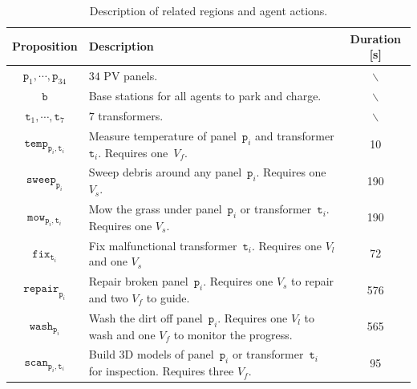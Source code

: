 \begin{table}[t]
	\centering
	\caption{Description of related regions and agent actions.}
	\label{fig:symbols}
	\begin{tabular}{|c|m{}|c|}\hline
		\textbf{Proposition} & \textbf{Description}\centering & \textbf{Duration} [s]\\ \hline
		$\texttt{p}_1,\cdots,\texttt{p}_{34}$ & $34$ PV panels. & $\backslash$ \\ \hline
		$\texttt{b}$ & Base stations for all agents to park and charge. & $\backslash$ \\ \hline
		$\texttt{t}_1,\cdots,\texttt{t}_7$ & $7$ transformers. & $\backslash$ \\ \hline
		$\texttt{temp}_{\texttt{p}_i,\texttt{t}_i}$ &
		Measure temperature of panel~$\texttt{p}_i$ and transformer $\texttt{t}_i$.
		Requires one~$V_f$. & 10 \\ \hline
		$\texttt{sweep}_{\texttt{p}_i}$& Sweep debris around any panel~$\texttt{p}_i$.
		Requires one $V_s$. & 190\\ \hline
		$\texttt{mow}_{\texttt{p}_i,\texttt{t}_i}$ &
		Mow the grass under panel~$\texttt{p}_i$ or transformer~$\texttt{t}_i$.
		Requires one $V_s$. & 190\\ \hline
		$\texttt{fix}_{\texttt{t}_i}$ &
		Fix malfunctional transformer~$\texttt{t}_i$.
		Requires one $V_l$ and one $V_s$ & 72\\ \hline
		$\texttt{repair}_{\texttt{p}_i}$ &
		Repair broken panel~$\texttt{p}_i$.
		Requires one $V_s$ to repair and two $V_f$ to guide. & 576\\ \hline
		$\texttt{wash}_{\texttt{p}_i}$ &
		Wash the dirt off panel~$\texttt{p}_i$.
		Requires one $V_l$ to wash and one $V_f$ to monitor the progress. & 565\\ \hline
		$\texttt{scan}_{\texttt{p}_i,\texttt{t}_i}$ &
		Build 3D models of panel~$\texttt{p}_i$ or transformer~$\texttt{t}_i$
		for inspection. Requires three $V_f$. & 95\\ \hline
	\end{tabular}
\end{table}
